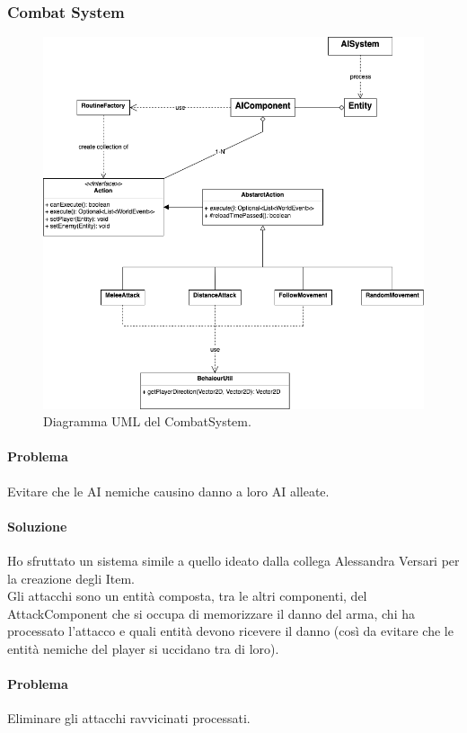 \documentclass[a4paper,12pt]{report}
\begin{document}
\subsubsection{Combat System}
\begin{figure}[h]
	\centering
	\includegraphics[width=\textwidth]{uml/UML_CombatSystem.png}
	\caption{Diagramma UML del CombatSystem.}
\end{figure}

\paragraph{Problema}
Evitare che le AI nemiche causino danno a loro AI alleate.
\paragraph{Soluzione}
Ho sfruttato un sistema simile a quello ideato dalla collega Alessandra Versari 
per la creazione degli Item.\\
Gli attacchi sono un entità composta, tra le altri componenti, del AttackComponent che 
si occupa di memorizzare il danno del arma, chi ha processato l'attacco e quali entità
devono ricevere il danno (così da evitare che le entità nemiche del player si 
uccidano tra di loro).

\paragraph{Problema}
Eliminare gli attacchi ravvicinati processati.
\end{document}
